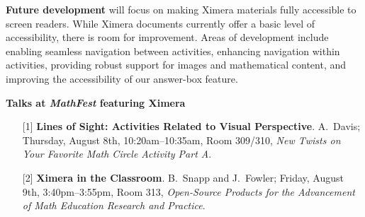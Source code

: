 \documentclass[twocolumn]{article}
\begin{document}
\vspace{-.2cm}  

\begin{xframe}
    {\sffamily\bfseries Future development} will focus on making Ximera
    materials fully accessible to screen readers. While Ximera documents
    currently
    offer a basic level of accessibility, there is room for
    improvement. Areas of development include enabling seamless navigation
    between activities, enhancing navigation within activities, providing
    robust
    support for images and mathematical content, and improving the
    accessibility of
    our answer-box feature.
\end{xframe}

\restoregeometry

\begin{xframe}
    {\sffamily\bfseries Talks at \textsl{MathFest} featuring Ximera}
    \begin{itemize}
        \item[{[1]}] \textbf{Lines of Sight: Activities Related to Visual
            Perspective}. A.\ Davis; Thursday, August 8th,
        10:20am--10:35am,
        Room 309/310,
        \textit{New Twists on Your Favorite Math Circle Activity Part A}.
        \item[{[2]}] \textbf{Ximera in the Classroom}. B.\ Snapp and J.\
        Fowler;
        Friday, August 9th, 3:40pm--3:55pm, Room 313, \textit{Open-Source
            Products for
            the Advancement of Math Education Research and Practice}.
    \end{itemize}
\end{xframe}

\vspace{.2cm}
\end{document}
